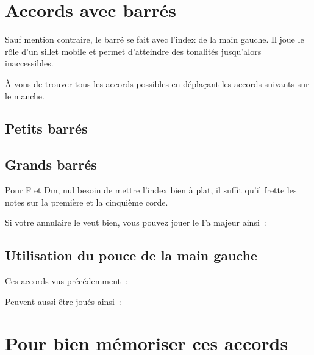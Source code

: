 \documentclass[11pt]{article}
\begin{document}

\section{Accords avec barrés}

Sauf mention contraire, le barré se fait avec l’index de la main gauche. Il
joue le rôle d’un sillet mobile et permet d’atteindre des tonalités jusqu’alors
inaccessibles.

À vous de trouver tous les accords possibles en déplaçant les accords suivants
sur le manche.

\subsection{Petits barrés}


\subsection{Grands barrés}



Pour F et Dm, nul besoin de mettre l’index bien à plat, il suffit qu’il
frette les notes sur la première et la cinquième corde.

Si votre annulaire le veut bien, vous pouvez jouer le Fa majeur ainsi~:


\subsection{Utilisation du pouce de la main gauche}

Ces accords vus précédemment~:


Peuvent aussi être joués ainsi~:


\section{Pour bien mémoriser ces accords}
\end{document}
